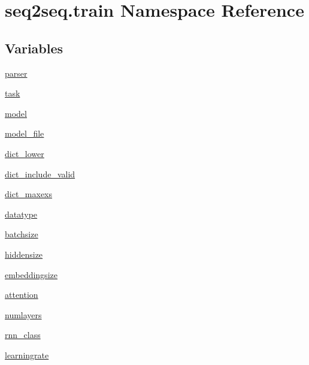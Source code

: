 \hypertarget{namespaceseq2seq_1_1train}{}\section{seq2seq.\+train Namespace Reference}
\label{namespaceseq2seq_1_1train}
\subsection*{Variables}
\begin{DoxyCompactItemize}
\item 
\hyperlink{namespaceseq2seq_1_1train_ae0c077888f9eec1c89d0ac716b9d3c1d}{parser}
\item 
\hyperlink{namespaceseq2seq_1_1train_aad6c776ac41bc888156753ef89496f09}{task}
\item 
\hyperlink{namespaceseq2seq_1_1train_a9146f4103ac43d9597ce833452cd90de}{model}
\item 
\hyperlink{namespaceseq2seq_1_1train_af769014804078bfb1203fbb8933f30ab}{model\+\_\+file}
\item 
\hyperlink{namespaceseq2seq_1_1train_a8ae37a9957756f117e8067c0b2eddba2}{dict\+\_\+lower}
\item 
\hyperlink{namespaceseq2seq_1_1train_a89bd6d6d0e3d331cbe9542c898bb634b}{dict\+\_\+include\+\_\+valid}
\item 
\hyperlink{namespaceseq2seq_1_1train_a36b7b67a3c84414eb6e758a58ad85a9b}{dict\+\_\+maxexs}
\item 
\hyperlink{namespaceseq2seq_1_1train_ab86023e033ed77502998ea712060a9ba}{datatype}
\item 
\hyperlink{namespaceseq2seq_1_1train_aa65c405e99f9d4444f67384885904c09}{batchsize}
\item 
\hyperlink{namespaceseq2seq_1_1train_ada8e559677887832ea3082b28275be1e}{hiddensize}
\item 
\hyperlink{namespaceseq2seq_1_1train_aa75e740b92949753f03b6f8a886b4722}{embeddingsize}
\item 
\hyperlink{namespaceseq2seq_1_1train_a9fe719271e349a4677bcd56cfa75f9dc}{attention}
\item 
\hyperlink{namespaceseq2seq_1_1train_a769b0fdbeb293c1f1b52cf20306b7307}{numlayers}
\item 
\hyperlink{namespaceseq2seq_1_1train_a46177da1cc74c4a2874e4a527d857f75}{rnn\+\_\+class}
\item 
\hyperlink{namespaceseq2seq_1_1train_acfa2ba94133a4b583eb2450fb2efc93a}{learningrate}
\item 

\end{DoxyCompactItemize}
